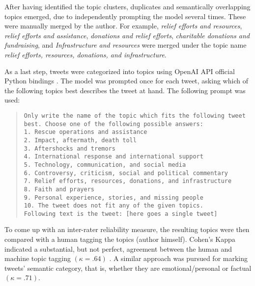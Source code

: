 \documentclass[11pt,a4paper]{article}
\begin{document}
    
    After having identified the topic clusters, duplicates and semantically overlapping topics emerged, due to independently prompting the model several times. These were manually merged by the author. For example, \textit{relief efforts and resources}, \textit{relief efforts and assistance}, \textit{donations and relief efforts}, \textit{charitable donations and fundraising}, and \textit{Infrastructure and resources} were merged under the topic name \textit{relief efforts, resources, donations, and infrastructure}.
    
    As a last step, tweets were categorized into topics using OpenAI API official Python bindings \cite{openai_llc_openai_2023}. The model was prompted once for each tweet, asking which of the following topics best describes the tweet at hand. The following prompt was used:  \begin{quote}
        \texttt{Only write the name of the topic which fits the following tweet best. Choose one of the following possible answers: \\
        1. Rescue operations and assistance \\
        2. Impact, aftermath, death toll \\
        3. Aftershocks and tremors \\
        4. International response and international support \\
        5. Technology, communication, and social media \\
        6. Controversy, criticism, social and political commentary \\
        7. Relief efforts, resources, donations, and infrastructure \\
        8. Faith and prayers \\
        9. Personal experience, stories, and missing people \\
        10. The tweet does not fit any of the given topics. \\
        Following text is the tweet: [here goes a single tweet]} 
    \end{quote}

    
    To come up with an inter-rater reliability measure, the resulting topics were then compared with a human tagging the topics (author himself). Cohen's Kappa  indicated a substantial, but not perfect, agreement between the human and machine topic tagging $(\kappa = .64)$ \cite{cohen_coefficient_1960}. A similar approach was pursued for marking tweets' semantic category, that is, whether they are emotional/personal or factual $(\kappa = .71)$.
    
\end{document}
